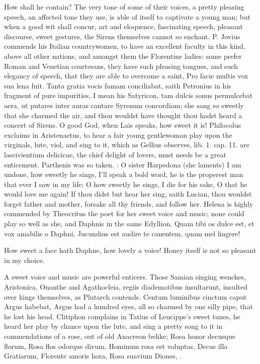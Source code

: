 {How shall he contain? The very tone of some of their voices, a pretty
pleasing speech, an affected tone they use, is able of itself to
captivate a young man; but when a good wit shall concur, art and
eloquence, fascinating speech, pleasant discourse, sweet gestures, the
Sirens themselves cannot so enchant. P. Jovius commends his
Italian countrywomen, to have an excellent faculty in this kind, above
all other nations, and amongst them the Florentine ladies: some prefer
Roman and Venetian courtesans, they have such pleasing tongues, and
such  elegancy of speech, that they are able to overcome a saint,
Pro facie multis vox sua lena fuit. Tanta gratia vocis famam
conciliabat, saith Petronius in his fragment of pure impurities,
I mean his Satyricon, tam dulcis sonus permulcebat aera, ut putares
inter auras cantare Syrenum concordiam; she sang so sweetly that she
charmed the air, and thou wouldst have thought thou hadst heard a
concert of Sirens. O good God, when Lais speaks, how sweet it is!
Philocolus exclaims in Aristenaetus, to hear a fair young gentlewoman
play upon the virginals, lute, viol, and sing to it, which as Gellius
observes, lib. 1. cap. 11. are lascivientium delicicae, the chief
delight of lovers, must needs be a great enticement. Parthenis was so
taken. : O sister
Harpedona (she laments) I am undone, how sweetly he sings, I'll
speak a bold word, he is the properest man that ever I saw in my life:
O how sweetly he sings, I die for his sake, O that he would love me
again! If thou didst but hear her sing, saith Lucian, thou
wouldst forget father and mother, forsake all thy friends, and follow
her. Helena is highly commended by Theocritus the poet for her
sweet voice and music; none could play so well as she, and Daphnis in
the same Edyllion,
Quam tibi os dulce est, et vox amabilis o Daphni,
Jucundius est audire te canentem, quam mel lingere!

How sweet a face hath Daphne, how lovely a voice!
Honey itself is not so pleasant in my choice.

A sweet voice and music are powerful enticers. Those Samian singing
wenches, Aristonica, Onanthe and Agathocleia, regiis diadematibus
insultarunt, insulted over kings themselves, as Plutarch
contends. Centum luminibus cinctum caput Argus habebat, Argus had a
hundred eyes, all so charmed by one silly pipe, that he lost his head.
Clitiphon complains in Tatius of Leucippe's sweet tunes, he heard
her play by chance upon the lute, and sing a pretty song to it in
commendations of a rose, out of old Anacreon belike;
Rosa honor decusque florum,
Rosa flos odorque divum,
Hominum rosa est voluptas,
Decus illa Gratiarum,
Florente amoris hora,
Rosa suavium Diones, \etc{}.

}
